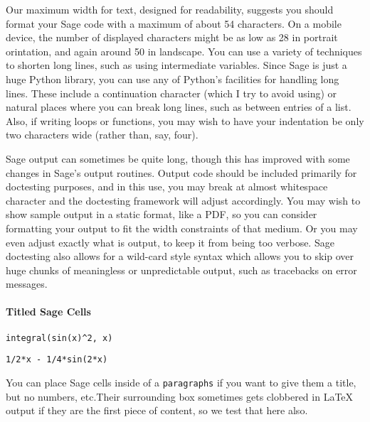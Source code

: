 \documentclass[10pt,]{article}
\theoremstyle{plain}
\theoremstyle{definition}
\theoremstyle{definition}
\theoremstyle{definition}
\theoremstyle{definition}
\theoremstyle{definition}
\theoremstyle{definition}
\numberwithin{equation}{section}
\begin{document}
\hypertarget{p-26}{}%
Our maximum width for text, designed for readability, suggests you should format your Sage code with a maximum of about 54 characters. On a mobile device, the number of displayed characters might be as low as 28 in portrait orintation, and again around 50 in landscape.  You can use a variety of techniques to shorten long lines, such as using intermediate variables.  Since Sage is just a huge Python library, you can use any of Python's facilities for handling long lines.  These include a continuation character (which I try to avoid using) or natural places where you can break long lines, such as between entries of a list.  Also, if writing loops or functions, you may wish to have your indentation be only two characters wide (rather than, say, four).%
\par
\hypertarget{p-27}{}%
Sage output can sometimes be quite long, though this has improved with some changes in Sage's output routines.  Output code should be included primarily for doctesting purposes, and in this use, you may break at almost whitespace character and the doctesting framework will adjust accordingly.  You may wish to show sample output in a static format, like a PDF, so you can consider formatting your output to fit the width constraints of that medium.  Or you may even adjust exactly what is output, to keep it from being too verbose.  Sage doctesting also allows for a wild-card style syntax which allows you to skip over huge chunks of meaningless or unpredictable output, such as tracebacks on error messages.%
\typeout{************************************************}
\typeout{************************************************}
\paragraph[{Titled Sage Cells}]{Titled Sage Cells}\hypertarget{paragraphs-1}{}
\leavevmode%
\begin{lstlisting}[style=sageinput]
integral(sin(x)^2, x)
\end{lstlisting}
\begin{lstlisting}[style=sageoutput]
1/2*x - 1/4*sin(2*x)
\end{lstlisting}
\hypertarget{p-28}{}%
You can place Sage cells inside of a \lstinline?paragraphs? if you want to give them a title, but no numbers, etc.\@  Their surrounding box sometimes gets clobbered in \LaTeX{} output if they are the first piece of content, so we test that here also.%
\typeout{************************************************}
\typeout{************************************************}
\end{document}
